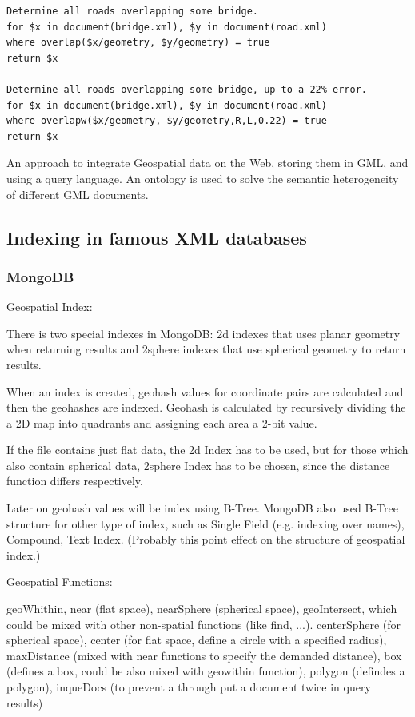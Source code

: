 \begin{verbatim}
Determine all roads overlapping some bridge.
for $x in document(bridge.xml), $y in document(road.xml)
where overlap($x/geometry, $y/geometry) = true
return $x

Determine all roads overlapping some bridge, up to a 22% error.
for $x in document(bridge.xml), $y in document(road.xml)
where overlapw($x/geometry, $y/geometry,R,L,0.22) = true
return $x 
\end{verbatim}

\cite{corcoles2003} An approach to integrate Geospatial data on the Web, storing them in GML, and using a query language. An ontology is used to solve the semantic heterogeneity of different GML documents.

\subsection{Indexing in famous XML databases}
\subsubsection{MongoDB}
\cite{mongogeneral2010}
\cite{mongoinaction2011}

Geospatial Index:

There is two special indexes in MongoDB: 2d indexes that uses planar geometry when returning results and 2sphere indexes that use spherical geometry to return results.

When an index is created, geohash values for coordinate pairs are calculated and then the geohashes are indexed.
Geohash is calculated by recursively dividing the a 2D map into quadrants and assigning each area a 2-bit value.


If the file contains just flat data, the 2d Index has to be used, but for those which also contain spherical data, 2sphere Index has to be chosen, since the distance function differs respectively.

Later on geohash values will be index using B-Tree. 
MongoDB also used B-Tree structure for other type of index, such as Single Field (e.g. indexing over names), Compound, Text Index. (Probably this point effect on the structure of geospatial index.)

Geospatial Functions:

geoWhithin, near (flat space), nearSphere (spherical space), geoIntersect, which could be mixed with other non-spatial functions (like find, ...). 
centerSphere (for spherical space), center (for flat space, define a circle with a specified radius), maxDistance (mixed with near functions to specify the demanded distance), box (defines a box, could be also mixed with geowithin function), polygon (defindes a polygon), inqueDocs (to prevent a through put a document twice in query results)

